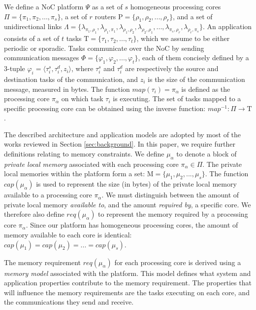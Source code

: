 \documentclass[10pt,conference]{IEEEtran}
\begin{document}
We define a NoC platform $\Psi$ as a set of $s$ homogeneous processing cores $\Pi = \lbrace \pi_1, \pi_2, ..., \pi_s \rbrace$, a set of $r$ routers $\mathrm{P} = \lbrace \rho_1, \rho_2, ..., \rho_r \rbrace$, and a set of unidirectional links $\Lambda = \lbrace \lambda_{\pi_1,\rho_1}, \lambda_{\rho_1,\pi_1}, \lambda_{\rho_1,\rho_2}, \lambda_{\rho_2,\rho_1}, ..., \lambda_{\pi_s,\rho_r}, \lambda_{\rho_r,\pi_s} \rbrace$. An application consists of a set of $t$ tasks $\mathrm{T} = \lbrace \tau_1, \tau_2, ..., \tau_t \rbrace$, which we assume to be either periodic or sporadic. Tasks communicate over the NoC by sending communication messages $\Phi = \lbrace \varphi_1, \varphi_2, ..., \varphi_t \rbrace$, each of them concisely defined by a 3-tuple $\varphi_i = \langle \tau^s_i, \tau^d_i, z_i \rangle$, where $\tau^s_i$ and $\tau^d_i$ are respectively the source and destination tasks of the communication, and $z_i$ is the size of the communication message, measured in bytes. The function $map(\tau_i) = \pi_\alpha$ is defined as the processing core $\pi_\alpha$ on which task $\tau_i$ is executing. The set of tasks mapped to a specific processing core can be obtained using the inverse function: $map^{-1}:\Pi \rightarrow \mathrm{T}$.

The described architecture and application models are adopted by most of the works reviewed in Section \ref{sec:background}. In this paper, we require further definitions relating to memory constraints. We define $\mu_\alpha$ to denote a block of \textit{private local memory} associated with each processing core $\pi_\alpha \in \Pi$. The private local memories within the platform form a set: $\mathrm{M} = \lbrace \mu_1, \mu_2, ..., \mu_s \rbrace$. The function $cap(\mu_\alpha)$ is used to represent the size (in bytes) of the private local memory available to a processing core $\pi_\alpha$. We must distinguish between the amount of private local memory \textit{available to}, and the amount \textit{required by}, a specific core. We therefore also define $req(\mu_\alpha)$ to represent the memory required by a processing core $\pi_\alpha$. Since our platform has homogeneous processing cores, the amount of memory available to each core is identical: $cap(\mu_1) = cap(\mu_2) = ... = cap(\mu_s)$.

The memory requirement $req(\mu_\alpha)$ for each processing core is derived using a \textit{memory model} associated with the platform. This model defines what system and application properties contribute to the memory requirement. The properties that will influence the memory requirements are the tasks executing on each core, and the communications they send and receive.
\end{document}
